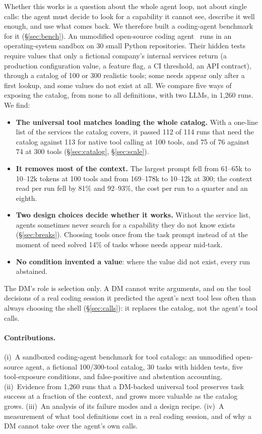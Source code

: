 Whether this works is a question about the whole agent loop, not about single calls: the agent must decide to
look for a capability it cannot see, describe it well enough, and use what comes back. We therefore built a
coding-agent benchmark for it (\S\ref{sec:bench}). An unmodified open-source coding agent~\citep{opencode} runs
in an operating-system sandbox on 30 small Python repositories. Their hidden tests require values that only a
fictional company's internal services return (a production configuration value, a feature flag, a CI
threshold, an API contract), through a catalog of 100 or 300 realistic tools; some needs appear only after a
first lookup, and some values do not exist at all. We compare five ways of exposing the catalog, from none to
all definitions, with two LLMs, in 1{,}260 runs. We find:
\begin{itemize}
\item \textbf{The universal tool matches loading the whole catalog.} With a one-line list of the services the
catalog covers, it passed 112 of 114 runs that need the catalog against 113 for native tool calling at 100
tools, and 75 of 76 against 74 at 300 tools (\S\ref{sec:catalog}, \S\ref{sec:scale}).
\item \textbf{It removes most of the context.} The largest prompt fell from 61--65k to 10--12k tokens at 100 tools
and from 169--178k to 10--12k at 300; the context read per run fell by 81\% and 92--93\%, the cost per run to
a quarter and an eighth.
\item \textbf{Two design choices decide whether it works.} Without the service list, agents sometimes never
search for a capability they do not know exists (\S\ref{sec:breaks}). Choosing tools once from the task
prompt instead of at the moment of need solved 14\% of tasks whose needs appear mid-task.
\item \textbf{No condition invented a value}: where the value did not exist, every run abstained.
\end{itemize}
The DM's role is selection only. A DM cannot write arguments, and on the tool decisions of a real coding
session it predicted the agent's next tool less often than always choosing the shell (\S\ref{sec:calls}): it
replaces the catalog, not the agent's tool calls.

\paragraph{Contributions.} (i)~A sandboxed coding-agent benchmark for tool catalogs: an unmodified open-source
agent, a fictional 100/300-tool catalog, 30 tasks with hidden tests, five tool-exposure conditions, and
false-positive and abstention accounting. (ii)~Evidence from 1{,}260 runs that a DM-backed universal tool
preserves task success at a fraction of the context, and grows more valuable as the catalog grows.
(iii)~An analysis of its failure modes and a design recipe. (iv)~A measurement of what tool definitions cost
in a real coding session, and of why a DM cannot take over the agent's own calls.


